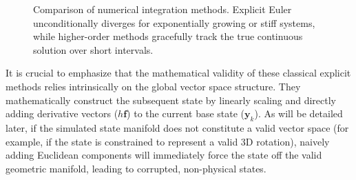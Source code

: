 \begin{figure}[htbp]
    \centering
    \caption{Comparison of numerical integration methods. Explicit Euler unconditionally diverges for exponentially growing or stiff systems, while higher-order methods gracefully track the true continuous solution over short intervals.}
    \label{fig:integration_methods}
\end{figure}

It is crucial to emphasize that the mathematical validity of these classical explicit methods relies intrinsically on the global vector space structure. They mathematically construct the subsequent state by linearly scaling and directly adding derivative vectors ($h \bm{f}$) to the current base state ($\bm{y}_k$). As will be detailed later, if the simulated state manifold does not constitute a valid vector space (for example, if the state is constrained to represent a valid 3D rotation), naively adding Euclidean components will immediately force the state off the valid geometric manifold, leading to corrupted, non-physical states.

